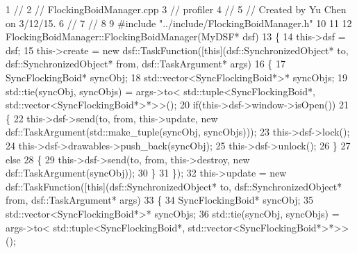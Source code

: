\begin{DoxyCodeInclude}
1 \textcolor{comment}{//}
2 \textcolor{comment}{//  FlockingBoidManager.cpp}
3 \textcolor{comment}{//  profiler}
4 \textcolor{comment}{//}
5 \textcolor{comment}{//  Created by Yu Chen on 3/12/15.}
6 \textcolor{comment}{//}
7 \textcolor{comment}{//}
8 
9 \textcolor{preprocessor}{#include "../include/FlockingBoidManager.h"}
10 
11 
12 FlockingBoidManager::FlockingBoidManager(MyDSF* dsf)
13 \{
14     this->dsf = dsf;
15     this->create = \textcolor{keyword}{new} dsf::TaskFunction([\textcolor{keyword}{this}](dsf::SynchronizedObject* to, dsf::SynchronizedObject* from,
       dsf::TaskArgument* args)
16                                          \{
17                                              SyncFlockingBoid* syncObj;
18                                              std::vector<SyncFlockingBoid*>* syncObjs;
19                                              std::tie(syncObj, syncObjs) = args->to<
      std::tuple<SyncFlockingBoid*, std::vector<SyncFlockingBoid*>*>>();
20                                              \textcolor{keywordflow}{if}(this->dsf->window->isOpen())
21                                              \{
22                                                  this->dsf->send(to, from, this->update, \textcolor{keyword}{new} 
      dsf::TaskArgument(std::make\_tuple(syncObj, syncObjs)));
23                                                  this->dsf->lock();
24                                                  this->dsf->drawables->push\_back(syncObj);
25                                                  this->dsf->unlock();
26                                              \}
27                                              \textcolor{keywordflow}{else}
28                                              \{
29                                                  this->dsf->send(to, from, this->destroy, \textcolor{keyword}{new} 
      dsf::TaskArgument(syncObj));
30                                              \}
31                                          \});
32     this->update = \textcolor{keyword}{new} dsf::TaskFunction([\textcolor{keyword}{this}](dsf::SynchronizedObject* to, dsf::SynchronizedObject* from,
       dsf::TaskArgument* args)
33                                          \{
34                                              SyncFlockingBoid* syncObj;
35                                              std::vector<SyncFlockingBoid*>* syncObjs;
36                                              std::tie(syncObj, syncObjs) = args->to<
      std::tuple<SyncFlockingBoid*, std::vector<SyncFlockingBoid*>*>>();

\end{DoxyCodeInclude}
